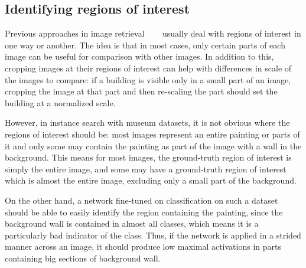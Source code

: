 \subsection{Identifying regions of interest}\label{sec:roi}
Previous approaches in image retrieval~\cite{gordo_end--end_2016}
~\cite{salvador_faster_2016}~\cite{tolias_particular_2015}
usually deal with regions of interest in one way or another.
The idea is that in most cases, only certain parts of each image can
be useful for comparison with other images. In addition to this,
cropping images at their regions of interest can help with differences
in scale of the images to compare: if a building is visible only in a small
part of an image, cropping the image at that part and then re-scaling
the part should set the building at a normalized scale.

However, in instance search with museum datasets, it is not obvious
where the regions of interest should be: most images represent an entire
painting or parts of it and only some may contain the painting as part
of the image with a wall in the background. This means for most images,
the ground-truth region of interest is simply the entire image, and some
may have a ground-truth region of interest which is almost the entire image,
excluding only a small part of the background.

On the other hand, a network fine-tuned on classification on such a dataset
should be able to easily identify the region containing the painting, since
the background wall is contained in almost all classes, which means it is a
particularly bad indicator of the class. Thus, if the network is applied in
a strided manner across an image, it should produce low maximal activations
in parts containing big sections of background wall.

